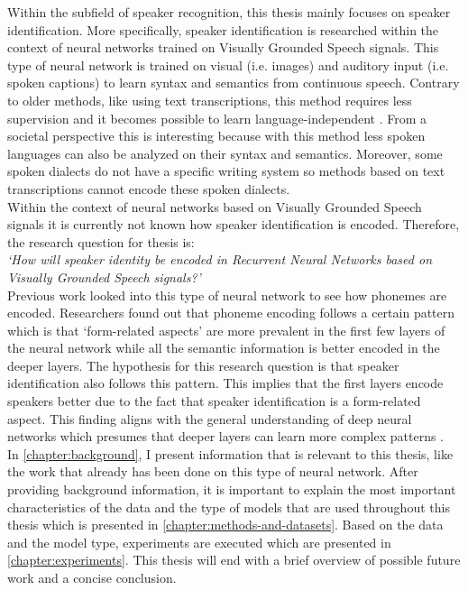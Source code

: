 \documentclass[a4paper, oneside]{book}
\begin{document}
Within the subfield of speaker recognition, this thesis mainly focuses on speaker identification. More specifically, speaker identification is researched within the context of neural networks trained on Visually Grounded Speech signals. This type of neural network is trained on visual (i.e. images) and auditory input (i.e. spoken captions) to learn syntax and semantics from continuous speech. Contrary to older methods, like using text transcriptions, this method requires less supervision and it becomes possible to learn language-independent \cite{HarwathG15}. From a societal perspective this is interesting because with this method less spoken languages can also be analyzed on their syntax and semantics. Moreover, some spoken dialects do not have a specific writing system so methods based on text transcriptions cannot encode these spoken dialects. \\

Within the context of neural networks based on Visually Grounded Speech signals it is currently not known how speaker identification is encoded. Therefore, the research question for thesis is: \\

\textit{‘How will speaker identity be encoded in Recurrent Neural Networks based on Visually Grounded Speech signals?’} \\


Previous work looked into this type of neural network to see how phonemes are encoded. Researchers \cite{AlishahiBC17} found out that phoneme encoding follows a certain pattern which is that ‘form-related aspects’ are more prevalent in the first few layers of the neural network while all the semantic information is better encoded in the deeper layers. The hypothesis for this research question is that speaker identification also follows this pattern. This implies that the first layers encode speakers better due to the fact that speaker identification is a form-related aspect. This finding aligns with the general understanding of deep neural networks which presumes that deeper layers can learn more complex patterns \cite{lecun2015deep}. \\

In \autoref{chapter:background}, I present information that is relevant to this thesis, like the work that already has been done on this type of neural network. After providing background information, it is important to explain the most important characteristics of the data and the type of models that are used throughout this thesis which is presented in \autoref{chapter:methods-and-datasets}. Based on the data and the model type, experiments are executed which are presented in \autoref{chapter:experiments}. This thesis will end with a brief overview of possible future work and a concise conclusion.
\end{document}
